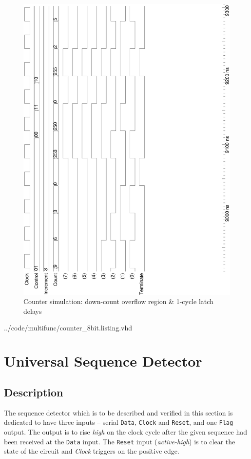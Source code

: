 \documentclass[10pt,a4paper]{report}
\begin{document}
\begin{figure}
\center
\includegraphics[scale=0.49,angle=-90]{graphs/counter_8bit_test2.ps}
\caption{\small{Counter simulation: down-count overflow region \& 1-cycle latch delays}} \label{wave:c8:w2}
\end{figure}

\pagebreak

{../code/multifunc/counter_8bit.listing.vhd}

\pagebreak
\section{Universal Sequence Detector}
\subsection{Description}

 The sequence detector which is to be described and
 verified in this section is dedicated to have three
 inputs -- serial \texttt{Data}, \texttt{Clock} and
 \texttt{Reset}, and one \texttt{Flag} output.
 The output is to rise \emph{high} on the clock
 cycle after the given sequence had been received
 at the \texttt{Data} input. The \texttt{Reset}
 input (\emph{active-high}) is to clear the
 state of the circuit and \emph{Clock} triggers
 on the positive edge.
\end{document}
